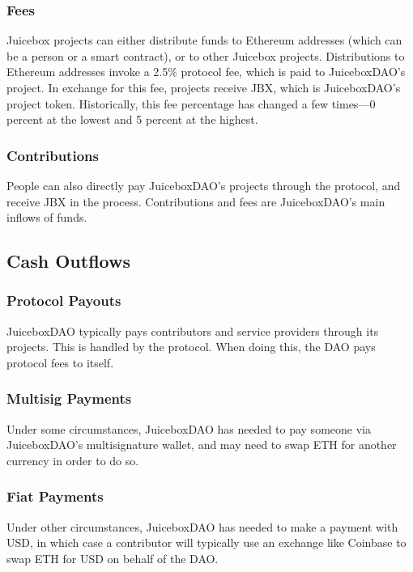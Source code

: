 \documentclass{article}
\begin{document}
\subsubsection{Fees}

Juicebox projects can either distribute funds to Ethereum addresses (which can be a person or a smart contract), or to other Juicebox projects. Distributions to Ethereum addresses invoke a 2.5\% protocol fee, which is paid to JuiceboxDAO's project. In exchange for this fee, projects receive JBX, which is JuiceboxDAO's project token. Historically, this fee percentage has changed a few times—0 percent at the lowest and 5 percent at the highest.

\subsubsection{Contributions}

People can also directly pay JuiceboxDAO's projects through the protocol, and receive JBX in the process. Contributions and fees are JuiceboxDAO's main inflows of funds.

\subsection{Cash Outflows}

\subsubsection{Protocol Payouts}

JuiceboxDAO typically pays contributors and service providers through its projects. This is handled by the protocol. When doing this, the DAO pays protocol fees to itself.

\subsubsection{Multisig Payments}

Under some circumstances, JuiceboxDAO has needed to pay someone via JuiceboxDAO's multisignature wallet, and may need to swap ETH for another currency in order to do so.

\subsubsection{Fiat Payments}

Under other circumstances, JuiceboxDAO has needed to make a payment with USD, in which case a contributor will typically use an exchange like Coinbase to swap ETH for USD on behalf of the DAO.
\end{document}
